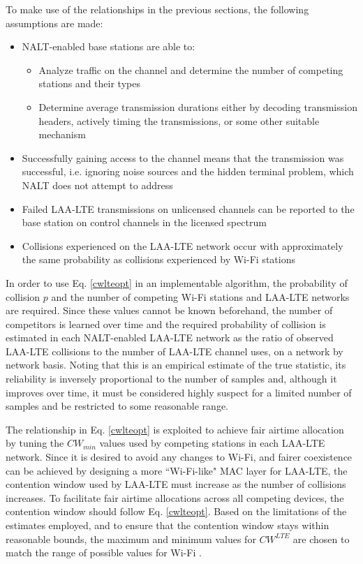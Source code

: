 To make use of the relationships in the previous sections, the following assumptions are made:
\begin{itemize}
	\item NALT-enabled base stations are able to:
	\begin{itemize}
	\item Analyze traffic on the channel and determine the number of competing stations and their types
	\item Determine average transmission durations either by decoding transmission headers, actively timing the transmissions, or some other suitable mechanism
	\end{itemize} 
	\item Successfully gaining access to the channel means that the transmission was successful, i.e. ignoring noise sources and the hidden terminal problem, which NALT does not attempt to address
	\item Failed \mbox{LAA-LTE} transmissions on unlicensed channels can be reported to the base station on control channels in the licensed spectrum
	\item Collisions experienced on the LAA-LTE network occur with approximately the same probability as collisions experienced by Wi-Fi stations
\end{itemize}

In order to use Eq. \ref{cwlteopt} in an implementable algorithm, the probability of collision  $p$ and the number of competing Wi-Fi stations and LAA-LTE networks are required. Since these values cannot be known beforehand, the number of competitors is learned over time and the required probability of collision is estimated in each NALT-enabled LAA-LTE network as the ratio of observed \mbox{LAA-LTE} collisions to the number of \mbox{LAA-LTE} channel uses, on a network by network basis.  Noting that this is an empirical estimate of the true statistic, its reliability is inversely proportional to the number of samples and, although it improves over time, it must be considered highly suspect for a limited number of samples and be restricted to some reasonable range. 

The relationship in Eq. \ref{cwlteopt} is exploited to achieve fair airtime allocation by tuning the $CW_{min}$ values used by competing stations in each LAA-LTE network.  Since it is desired to avoid any changes to \mbox{Wi-Fi}, and fairer coexistence can be achieved by designing a more \mbox{``\mbox{Wi-Fi}-like"} MAC layer for \mbox{LAA-LTE}, the contention window used by \mbox{LAA-LTE} must increase as the number of collisions increases.  To facilitate fair airtime allocations across all competing devices, the contention window should follow Eq. \ref{cwlteopt}.  Based on the limitations of the estimates employed, and to ensure that the contention window stays within reasonable bounds, the maximum and minimum values for $CW^{LTE}$ are chosen to match the range of possible values for \mbox{Wi-Fi} \cite{80211}.  

